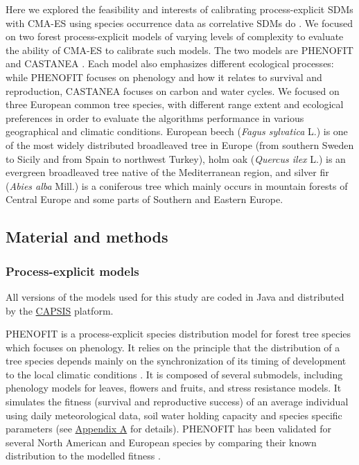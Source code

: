 Here we explored the feasibility and interests of calibrating
process-explicit SDMs with CMA-ES using species occurrence data as
correlative SDMs do \citep[fitted process-explicit models \emph{sensu}][]{Dormann2012}. We
focused on two forest process-explicit models of varying levels of
complexity to evaluate the ability of CMA-ES to calibrate such models.
The two models are PHENOFIT \citep[27 to 36 parameters,][]{Chuine2001} and
CASTANEA \citep[77 parameters,][]{Dufrene2005}. Each model also emphasizes different ecological
processes: while PHENOFIT focuses on phenology and how it relates to
survival and reproduction, CASTANEA focuses on carbon and water cycles.
We focused on three European common tree species, with different range
extent and ecological preferences in order to evaluate the algorithms
performance in various geographical and climatic conditions. European
beech (\emph{Fagus sylvatica} L.) is one of the most widely distributed
broadleaved tree in Europe (from southern Sweden to Sicily and from
Spain to northwest Turkey), holm oak (\emph{Quercus ilex} L.) is an
evergreen broadleaved tree native of the Mediterranean region, and
silver fir (\emph{Abies alba} Mill.) is a coniferous tree which mainly
occurs in mountain forests of Central Europe and some parts of Southern
and Eastern Europe.

\subsection{Material and methods}\label{methods}

\subsubsection{Process-explicit models}\label{sec:pbmodels}

All versions of the models used for this study are coded in Java and
distributed by the \href{https://capsis.cirad.fr/capsis/home}{CAPSIS}
platform.

PHENOFIT is a process-explicit species distribution model for forest tree
species which focuses on phenology. It relies on the principle that the
distribution of a tree species depends mainly on the synchronization of
its timing of development to the local climatic conditions
\citep{Chuine2001}. It is
composed of several submodels, including phenology models for leaves,
flowers and fruits, and stress resistance models. It simulates the
fitness (survival and reproductive success) of an average individual
using daily meteorological data, soil water holding capacity and species
specific parameters (see \hyperref[chap1:appendixA]{Appendix A} for
details). PHENOFIT has been validated for several North American and
European species by comparing their known distribution to the modelled
fitness \citep[e.g.][]{Morin2007, Saltre2013, Duputie2015, Gauzere2020}.

